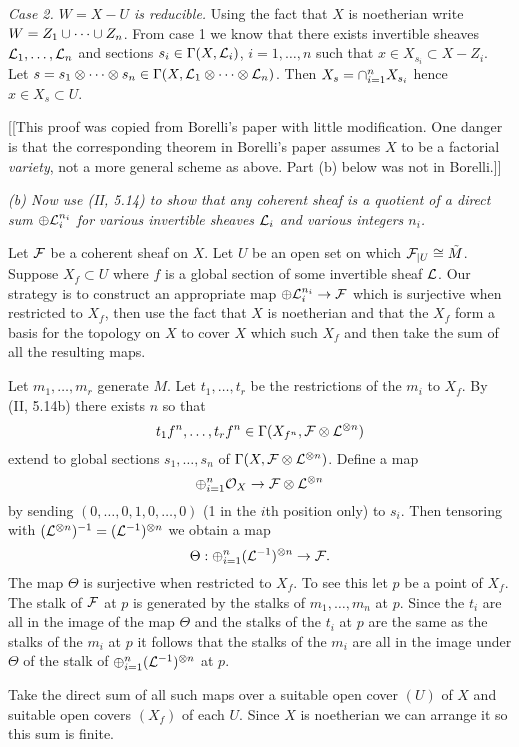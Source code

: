 \documentclass[12pt]{article}
\begin{document}
{\em Case 2. $W=X-U$ is reducible.}
Using the fact that $X$ is noetherian write
$W=Z_1\cup \cdots \cup Z_n$. From case 1 we know that
there exists invertible sheaves $\mathcal{L}_1,\ldots,\mathcal{L}_n$ and sections
$s_i\in\Gamma(X,\mathcal{L}_i)$, $i=1,\ldots,n$ such that $x\in X_{s_i}\subset X-Z_i$. 
Let $s=s_1\otimes\cdots\otimes s_n\in\Gamma(X,\mathcal{L}_1\otimes\cdots\otimes\mathcal{L}_n)$. 
Then $X_s=\cap_{i=1}^n X_{s_i}$ hence $x\in X_s\subset U$. 

[[This proof was copied from Borelli's paper with little modification. One
danger is that the corresponding theorem in Borelli's paper assumes $X$ to be
a factorial {\em variety}, not a more general scheme as above. Part (b)
below was not in Borelli.]]

{\em (b) Now use (II, 5.14) to show that any coherent sheaf is a quotient
of a direct sum $\oplus\mathcal{L}_i^{n_i}$ for various invertible sheaves
$\mathcal{L}_i$ and various integers $n_i$. }

Let $\mathcal{F}$ be a coherent sheaf on $X$. 
Let $U$ be an open set on which $\mathcal{F}_{|U}\cong\tilde{M}$. 
Suppose $X_f\subset U$ where $f$ is a global section of some
invertible sheaf $\mathcal{L}$. Our strategy is to construct an appropriate
map $\oplus\mathcal{L}_i^{n_i}\rightarrow \mathcal{F}$ which is surjective when 
restricted to $X_f$, then use the fact that $X$ is noetherian and
that the $X_f$ form a basis for the topology on $X$ to cover $X$
which such $X_f$ and then take the sum of all the resulting maps.

Let $m_1,\ldots,m_r$ generate $M$. Let $t_1,\ldots,t_r$ be the
restrictions of the $m_i$ to $X_f$. By (II, 5.14b) there exists $n$
so that 
$$t_1 f^n,\ldots,t_r f^n\in\Gamma(X_{f^n},\mathcal{F}\otimes\mathcal{L}^{\otimes n})$$
extend to global sections $s_1,\ldots,s_n$ of 
$\Gamma(X,\mathcal{F}\otimes\mathcal{L}^{\otimes n})$. Define a map
$$\oplus_{i=1}^n \mathcal{O}_X\rightarrow\mathcal{F}\otimes\mathcal{L}^{\otimes n}$$
by sending $(0,\ldots,0,1,0,\ldots,0)$ (1 in the $i$th position only)
to $s_i$. Then tensoring with
$(\mathcal{L}^{\otimes n})^{-1} =(\mathcal{L}^{-1})^{\otimes n}$
we obtain a map
$$\Theta:\oplus_{i=1}^n (\mathcal{L}^{-1})^{\otimes n}\rightarrow\mathcal{F}.$$
The map $\Theta$ is surjective when restricted to $X_f$. 
To see this let $p$ be a point of $X_f$. The stalk of
$\mathcal{F}$ at $p$ is generated by the stalks of $m_1,\ldots,m_n$ 
at $p$. Since the $t_i$ are all in the image of the map $\Theta$ and
the stalks of the $t_i$ at $p$ are the same as the stalks of the $m_i$
at $p$ it follows that the stalks of the $m_i$ are all in the image 
under $\Theta$ of the stalk of $\oplus_{i=1}^n(\mathcal{L}^{-1})^{\otimes n}$
at $p$. 

Take the direct sum of all such maps over a suitable open cover
$(U)$ of $X$ and suitable open covers $(X_f)$ of each $U$. Since
$X$ is noetherian we can arrange it so this sum is finite. \
\end{document}
